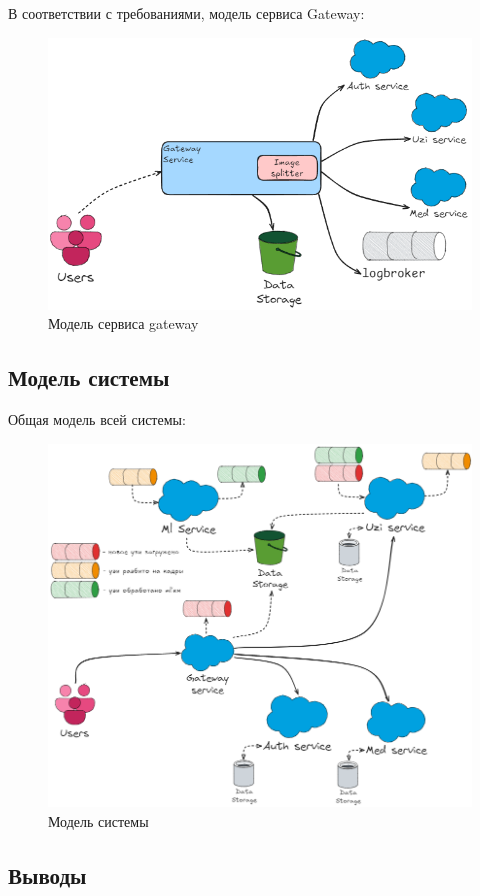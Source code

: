 В соответствии с требованиями, модель сервиса Gateway:
\begin{figure}[H]%
	\begin{center}
		\includegraphics[width=.6\columnwidth]{./img/gateway_model.png}%
	\end{center}
	\caption{Модель сервиса gateway}%
	\label{pic:auth_model}%
\end{figure}


\subsection{Модель системы}

Общая модель всей системы:
\begin{figure}[H]%
	\begin{center}
		\includegraphics[width=.9\columnwidth]{./img/system_model.png}%
	\end{center}
	\caption{Модель системы}%
	\label{pic:auth_model}%
\end{figure}


\subsection{Выводы}

